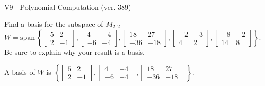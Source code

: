\begin{exercise}
  \begin{exerciseTitle}V9 - Polynomial Computation (ver. 389)\end{exerciseTitle}
  \begin{exerciseStatement}
    Find a basis for the subspace of \(M_{2,2}\) 
\[W=\mathrm{span}\ \left\{\left[\begin{array}{cc}
5 & 2 \\
2 & -1
\end{array}\right] , \left[\begin{array}{cc}
4 & -4 \\
-6 & -4
\end{array}\right] , \left[\begin{array}{cc}
18 & 27 \\
-36 & -18
\end{array}\right] , \left[\begin{array}{cc}
-2 & -3 \\
4 & 2
\end{array}\right] , \left[\begin{array}{cc}
-8 & -2 \\
14 & 8
\end{array}\right]\right\}.\]
 Be sure to explain why your result is a basis.


  \end{exerciseStatement}
  \begin{exerciseAnswer}
   A basis of \(W\) is  \(\left\{\left[\begin{array}{cc}
5 & 2 \\
2 & -1
\end{array}\right] , \left[\begin{array}{cc}
4 & -4 \\
-6 & -4
\end{array}\right] , \left[\begin{array}{cc}
18 & 27 \\
-36 & -18
\end{array}\right]\right\}\).
  


  \end{exerciseAnswer}
\end{exercise}